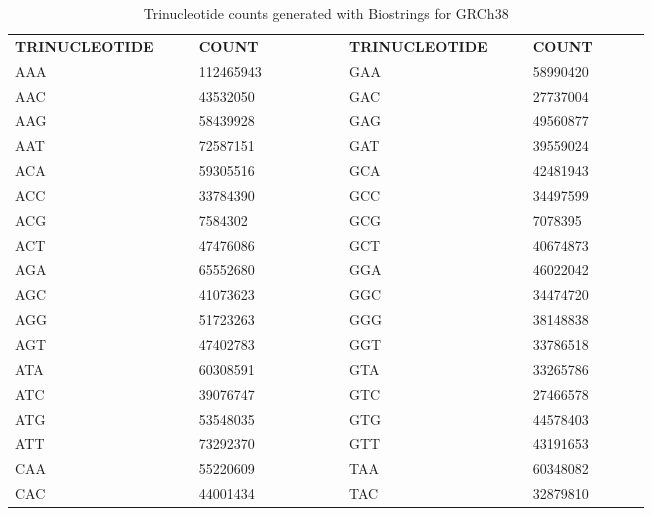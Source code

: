 \begin{table}[!ht]
\caption[Trinucleotide counts of GRCh38]{Trinucleotide counts generated with Biostrings \cite{Pages2020} for GRCh38}\label{A:mmf:tab:tricounts}
\centering
{}
\begin{tabular}{|C{0.2\linewidth} | R{0.15\linewidth}| C{0.04\linewidth} |C{0.2\linewidth} | R{0.15\linewidth}|}
\toprule
 \hhline{|-|-|~|-|-|}
 \textbf{TRINUCLEOTIDE} & \textbf{COUNT} &  & \textbf{TRINUCLEOTIDE} & \textbf{COUNT}\\
 \hhline{|-|-|~|-|-|}

AAA & \num{ 112465943} &  & GAA & \num{ 58990420} \\
AAC & \num{ 43532050} &  & GAC & \num{ 27737004} \\
AAG & \num{ 58439928} &  & GAG & \num{ 49560877} \\
AAT & \num{ 72587151} &  & GAT & \num{ 39559024} \\
ACA & \num{ 59305516} &  & GCA & \num{ 42481943} \\
ACC & \num{ 33784390} &  & GCC & \num{ 34497599} \\
ACG & \num{ 7584302} &  & GCG & \num{ 7078395} \\
ACT & \num{ 47476086} &  & GCT & \num{ 40674873} \\
AGA & \num{ 65552680} &  & GGA & \num{ 46022042} \\
AGC & \num{ 41073623} &  &GGC & \num{ 34474720} \\
AGG & \num{ 51723263} &  &GGG & \num{ 38148838} \\
AGT & \num{ 47402783} &  &GGT & \num{ 33786518} \\
ATA & \num{ 60308591} &  &GTA & \num{ 33265786} \\
ATC & \num{ 39076747} &  &GTC & \num{ 27466578} \\
ATG & \num{ 53548035} &  &GTG & \num{ 44578403} \\
ATT & \num{ 73292370} &  &GTT & \num{ 43191653} \\
CAA & \num{ 55220609} &  &TAA & \num{ 60348082} \\
CAC & \num{ 44001434} &  &TAC & \num{ 32879810} \\

\end{tabular}
\end{table}
